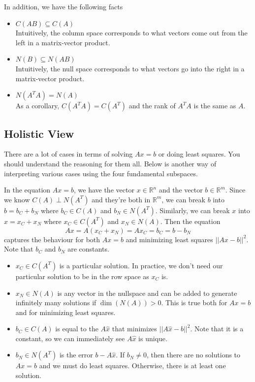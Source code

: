 \documentclass[11pt]{article}
\theoremstyle{plain} %
\theoremstyle{definition}
\theoremstyle{remark}
\begin{document}
In addition, we have the following facts
\begin{itemize}
\item \textbf{$C(AB) \subseteq C(A)$}\\
Intuitively, the column space corresponds to what vectors come out from the left in a matrix-vector product.
\item \textbf{$N(B) \subseteq N(AB)$}\\
Intuitively, the null space corresponds to what vectors go into the right in a matrix-vector product.
\item \textbf{$N(A^TA) = N(A)$}\\
As a corollary, $C(A^TA) = C(A^T)$ and the rank of $A^TA$ is the same as $A$.
\end{itemize}

\subsection{Holistic View}
There are a lot of cases in terms of solving $Ax=b$ or doing least squares. You should understand the reasoning for them all. Below is another way of interpreting various cases using the four fundamental subspaces.

In the equation $Ax = b$, we have the vector $x \in \mathbb{R}^n$ and the vector $b \in \mathbb{R}^m$. Since we know $C(A) \perp N(A^T)$ and they're both in $\mathbb{R}^m$, we can break $b$ into $b = b_C + b_N$ where $b_C \in C(A)$ and $b_N \in N(A^T)$. Similarly, we can break $x$ into $x = x_C + x_N$ where $x_C \in C(A^T)$ and $x_N \in N(A)$. Then the equation
$$Ax = A(x_C + x_N) = Ax_C =  b_C = b - b_N$$
captures the behaviour for both $Ax=b$ and minimizing least squares $||Ax-b||^2$. Note that $b_C$ and $b_N$ are constants.

\begin{itemize}
\item $x_C \in C(A^T)$ is a particular solution. In practice, we don't need our particular solution to be in the row space as $x_C$ is.
\item $x_N \in N(A)$ is any vector in the nullspace and can be added to generate infinitely many solutions if $\dim(N(A)) > 0$. This is true both for $Ax = b$ and for minimizing least squares.
\item $b_C \in C(A)$ is equal to the $A\hat{x}$ that minimizes $||A\hat{x}-b||^2$. Note that it is a constant, so we can immediately see $A\hat{x}$ is unique.
\item $b_N \in N(A^T)$ is the error $b - A\hat{x}$. If $b_N \neq 0$, then there are no solutions to $Ax = b$ and we must do least squares. Otherwise, there is at least one solution.
\end{itemize}
\end{document}

